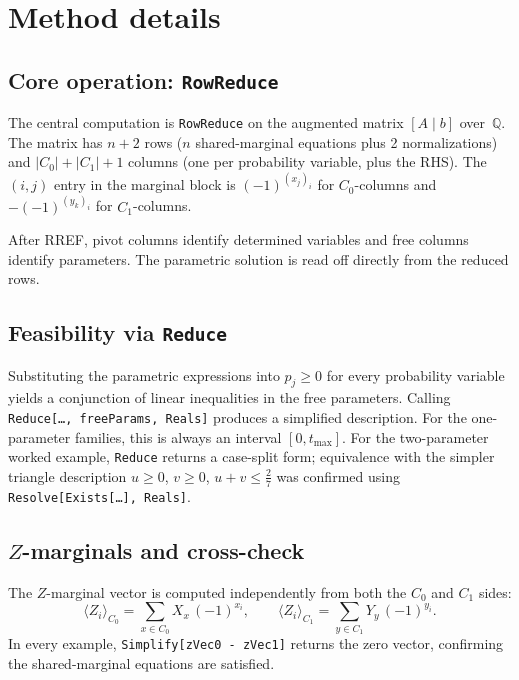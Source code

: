 \documentclass{article}
\begin{document}
\section{Method details}
\label{sec:method}

\subsection{Core operation: \texttt{RowReduce}}

The central computation is \texttt{RowReduce} on the augmented matrix $[A\mid b]$ over~$\mathbb{Q}$.
The matrix has $n+2$ rows ($n$ shared-marginal equations plus 2 normalizations) and $|C_0|+|C_1|+1$ columns (one per probability variable, plus the RHS).
The $(i,j)$ entry in the marginal block is $(-1)^{(x_j)_i}$ for $C_0$-columns and $-(-1)^{(y_k)_i}$ for $C_1$-columns.

After RREF, pivot columns identify determined variables and free columns identify parameters.
The parametric solution is read off directly from the reduced rows.

\subsection{Feasibility via \texttt{Reduce}}

Substituting the parametric expressions into $p_j\ge 0$ for every probability variable yields a conjunction of linear inequalities in the free parameters.
Calling \texttt{Reduce[\ldots, freeParams, Reals]} produces a simplified description.
For the one-parameter families, this is always an interval $[0,t_{\max}]$.
For the two-parameter worked example, \texttt{Reduce} returns a case-split form; equivalence with the simpler triangle description $u\ge0$, $v\ge0$, $u+v\le\frac{2}{7}$ was confirmed using \texttt{Resolve[Exists[\ldots], Reals]}.

\subsection{$Z$-marginals and cross-check}

The $Z$-marginal vector is computed independently from both the $C_0$ and $C_1$ sides:
\[
\langle Z_i\rangle_{C_0}
= \sum_{x\in C_0} X_x\,(-1)^{x_i},
\qquad
\langle Z_i\rangle_{C_1}
= \sum_{y\in C_1} Y_y\,(-1)^{y_i}.
\]
In every example, \texttt{Simplify[zVec0 - zVec1]} returns the zero vector, confirming the shared-marginal equations are satisfied.
\end{document}
